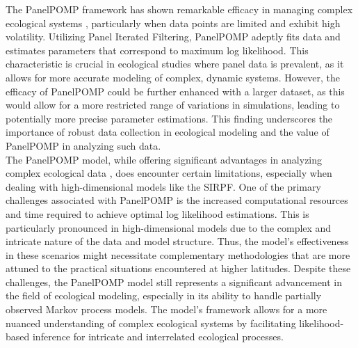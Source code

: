 \documentclass[12pt]{article}
\begin{document}
The PanelPOMP framework has shown remarkable efficacy in managing complex ecological systems \citep{Carles2020}, particularly when data points are limited and exhibit high volatility. Utilizing Panel Iterated Filtering, PanelPOMP adeptly fits data and estimates parameters that correspond to maximum log likelihood. This characteristic is crucial in ecological studies where panel data is prevalent, as it allows for more accurate modeling of complex, dynamic systems. However, the efficacy of PanelPOMP could be further enhanced with a larger dataset, as this would allow for a more restricted range of variations in simulations, leading to potentially more precise parameter estimations. This finding underscores the importance of robust data collection in ecological modeling and the value of PanelPOMP in analyzing such data.\\

The PanelPOMP model, while offering significant advantages in analyzing complex ecological data \citep{Carles2020}, does encounter certain limitations, especially when dealing with high-dimensional models like the SIRPF. One of the primary challenges associated with PanelPOMP is the increased computational resources and time required to achieve optimal log likelihood estimations. This is particularly pronounced in high-dimensional models due to the complex and intricate nature of the data and model structure. Thus, the model's effectiveness in these scenarios might necessitate complementary methodologies that are more attuned to the practical situations encountered at higher latitudes. Despite these challenges, the PanelPOMP model still represents a significant advancement in the field of ecological modeling, especially in its ability to handle partially observed Markov process models. The model's framework allows for a more nuanced understanding of complex ecological systems by facilitating likelihood-based inference for intricate and interrelated ecological processes.\\




\end{document}
